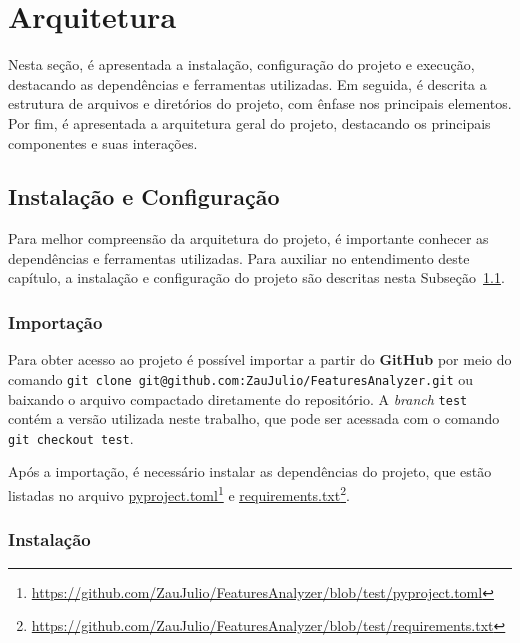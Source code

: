 \section{Arquitetura}
\label{sec:3:estrutura-projeto}

Nesta seção, é apresentada a instalação, configuração do projeto e execução, destacando as dependências e ferramentas utilizadas. Em seguida, é descrita a estrutura de arquivos e diretórios do projeto, com ênfase nos principais elementos. Por fim, é apresentada a arquitetura geral do projeto, destacando os principais componentes e suas interações.

\subsection{Instalação e Configuração}
\label{sec:3:install-configure}

Para melhor compreensão da arquitetura do projeto, é importante conhecer as dependências e ferramentas utilizadas. Para auxiliar no entendimento deste capítulo, a instalação e configuração do projeto são descritas nesta Subseção~\ref{sec:3:install-configure}.

\subsubsection{Importação}
\label{subsec:3:importacao}

Para obter acesso ao projeto é possível importar a partir do \textbf{GitHub} por meio do comando \verb|git clone git@github.com:ZauJulio/FeaturesAnalyzer.git| ou baixando o arquivo compactado diretamente do repositório. A \textit{branch} \texttt{test} contém a versão utilizada neste trabalho, que pode ser acessada com o comando \verb|git checkout test|.

\newcommand\urlPyproject{https://github.com/ZauJulio/FeaturesAnalyzer/blob/test/pyproject.toml}
\newcommand\urlRequirements{https://github.com/ZauJulio/FeaturesAnalyzer/blob/test/requirements.txt}

Após a importação, é necessário instalar as dependências do projeto, que estão listadas no arquivo \href{\urlPyproject}{\underline{pyproject.toml}}\footnote{\url{\urlPyproject}} e \href{\urlRequirements}{\underline{requirements.txt}}\footnote{\url{\urlRequirements}}.

\subsubsection{Instalação}
\label{subsec:3:instalacao}


